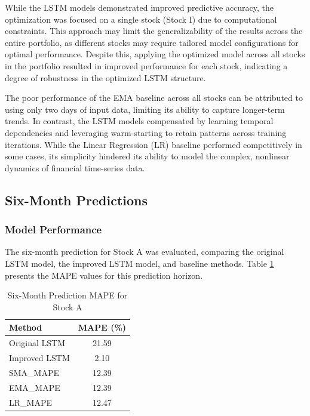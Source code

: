 \documentclass[10pt,twocolumn]{article}
\begin{document}
While the LSTM models demonstrated improved predictive accuracy, the optimization was focused on a single stock (Stock I) due to computational constraints. This approach may limit the generalizability of the results across the entire portfolio, as different stocks may require tailored model configurations for optimal performance. Despite this, applying the optimized model across all stocks in the portfolio resulted in improved performance for each stock, indicating a degree of robustness in the optimized LSTM structure.

The poor performance of the EMA baseline across all stocks can be attributed to using only two days of input data, limiting its ability to capture longer-term trends. In contrast, the LSTM models compensated by learning temporal dependencies and leveraging warm-starting to retain patterns across training iterations. While the Linear Regression (LR) baseline performed competitively in some cases, its simplicity hindered its ability to model the complex, nonlinear dynamics of financial time-series data.

\subsection{Six-Month Predictions}

\subsubsection{Model Performance}

The six-month prediction for Stock A was evaluated, comparing the original LSTM model, the improved LSTM model, and baseline methods. Table \ref{tab:six_month_mape} presents the MAPE values for this prediction horizon.

\begin{table}[htbp]
    \centering
    \caption{Six-Month Prediction MAPE for Stock A}
    \label{tab:six_month_mape}
    \setlength{\arrayrulewidth}{0.8pt} %
    \begin{tabular}{|l|c|}
        \hline
        \textbf{Method} & \textbf{MAPE (\%)} \\
        \hline
        Original LSTM   & 21.59             \\
        Improved LSTM   & 2.10              \\
        SMA\_MAPE       & 12.39             \\
        EMA\_MAPE       & 12.39             \\
        LR\_MAPE        & 12.47             \\
        \hline
    \end{tabular}
\end{table}
\end{document}

